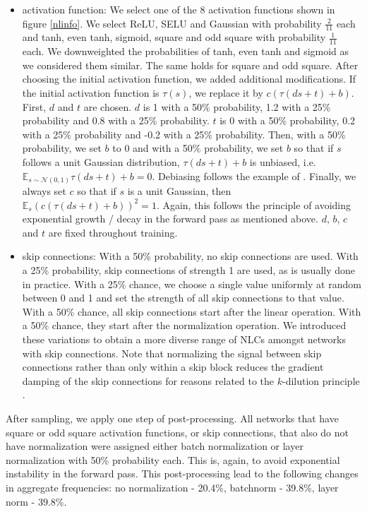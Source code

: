 \documentclass{article} %
\begin{document}
\begin{itemize}
\item activation function: We select one of the 8 activation functions shown in figure \ref{nlinfo}. We select ReLU, SELU and Gaussian with probability $\frac{2}{11}$ each and tanh, even tanh, sigmoid, square and odd square with probability $\frac{1}{11}$ each. We downweighted the probabilities of tanh, even tanh and sigmoid as we considered them similar. The same holds for square and odd square. After choosing the initial activation function, we added additional modifications. If the initial activation function is $\tau(s)$, we replace it by $c(\tau(ds+t)+b)$. First, $d$ and $t$ are chosen. $d$ is 1 with a 50\% probability, 1.2 with a 25\% probability and 0.8 with a 25\% probability. $t$ is 0 with a 50\% probability, 0.2 with a 25\% probability and -0.2 with a 25\% probability. Then, with a 50\% probability, we set $b$ to 0 and with a 50\% probability, we set $b$ so that if $s$ follows a unit Gaussian distribution, $\tau(ds+t)+b$ is unbiased, i.e. $\mathbb{E}_{s\sim \mathcal{N}(0,1)}\tau(ds+t)+b = 0$. Debiasing follows the example of \citet{normProp}. Finally, we always set $c$ so that if $s$ is a unit Gaussian, then $\mathbb{E}_s(c(\tau(ds+t)+b))^2 = 1$. Again, this follows the principle of avoiding exponential growth / decay in the forward pass as mentioned above. $d$, $b$, $c$ and $t$ are fixed throughout training.
\item skip connections: With a 50\% probability, no skip connections are used. With a 25\% probability, skip connections of strength 1 are used, as is usually done in practice. With a 25\% chance, we choose a single value uniformly at random between 0 and 1 and set the strength of all skip connections to that value. With a 50\% chance, all skip connections start after the linear operation. With a 50\% chance, they start after the normalization operation. We introduced these variations to obtain a more diverse range of NLCs amongst networks with skip connections. Note that normalizing the signal between skip connections rather than only within a skip block reduces the gradient damping of the skip connections for reasons related to the $k$-dilution principle \citep{expl}.
\end{itemize}

After sampling, we apply one step of post-processing. All networks that have square or odd square activation functions, or skip connections, that also do not have normalization were assigned either batch normalization or layer normalization with 50\% probability each. This is, again, to avoid exponential instability in the forward pass. This post-processing lead to the following changes in aggregate frequencies: no normalization - 20.4\%, batchnorm - 39.8\%, layer norm - 39.8\%.
\end{document}
